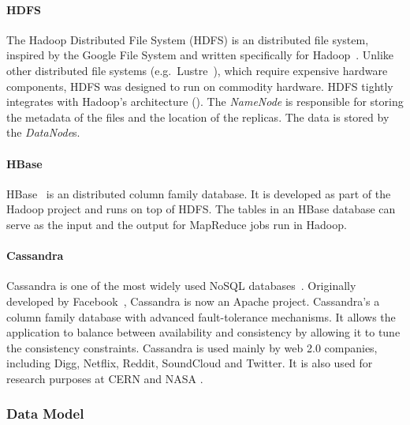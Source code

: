 
\paragraph{HDFS}

The Hadoop Distributed File System (HDFS) is an distributed file system, inspired by the Google File System and written specifically for Hadoop~\cite{Hadoop}. Unlike other distributed file systems (e.g.\ Lustre~\cite{Lustre}), which require expensive hardware components, HDFS was designed to run on commodity hardware. HDFS tightly integrates with Hadoop's architecture ().%
The \mbox{\emph{NameNode}} is responsible for storing the metadata of the files and the location of the replicas. The data is stored by the \mbox{\emph{DataNode}s}.


\paragraph{HBase} 

HBase~\cite{HBase} is an distributed column family database. It is developed as part of the Hadoop project and runs on top of HDFS. The tables in an HBase database can serve as the input and the output for MapReduce jobs run in Hadoop.

\paragraph{Cassandra}

Cassandra is one of the most widely used NoSQL databases~\cite{Cassandra}. Originally developed by Facebook~\cite{Lakshman:2010:CDS:1773912.1773922}, Cassandra is now an Apache project. 
Cassandra's a column family database with advanced fault-tolerance mechanisms. It allows the application to balance between availability and consistency by allowing it to tune the consistency constraints. Cassandra is used mainly by web 2.0 companies, including Digg, Netflix, Reddit, SoundCloud and Twitter. It is also used for research purposes at CERN and NASA \cite{CassandraCompanies}.

\subsubsection{Data Model}

